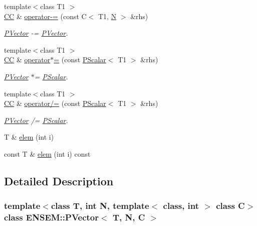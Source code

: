 \begin{DoxyCompactItemize}
{\footnotesize template$<$class T1 $>$ }\\\mbox{\hyperlink{classENSEM_1_1PVector_a92dc0a0a301a3dc96f7be5d337019bc7}{CC}} \& \mbox{\hyperlink{classENSEM_1_1PVector_afe4c144dcca484fed4ee1924d1e387be}{operator-\/=}} (const C$<$ T1, \mbox{\hyperlink{operator__name__util_8cc_a7722c8ecbb62d99aee7ce68b1752f337}{N}} $>$ \&rhs)
\begin{DoxyCompactList}\small\item\em \mbox{\hyperlink{classENSEM_1_1PVector}{P\+Vector}} -\/= \mbox{\hyperlink{classENSEM_1_1PVector}{P\+Vector}}. \end{DoxyCompactList}\item 
{\footnotesize template$<$class T1 $>$ }\\\mbox{\hyperlink{classENSEM_1_1PVector_a92dc0a0a301a3dc96f7be5d337019bc7}{CC}} \& \mbox{\hyperlink{classENSEM_1_1PVector_af17add91449d0507d1a0361ba1a3cc64}{operator$\ast$=}} (const \mbox{\hyperlink{classENSEM_1_1PScalar}{P\+Scalar}}$<$ T1 $>$ \&rhs)
\begin{DoxyCompactList}\small\item\em \mbox{\hyperlink{classENSEM_1_1PVector}{P\+Vector}} $\ast$= \mbox{\hyperlink{classENSEM_1_1PScalar}{P\+Scalar}}. \end{DoxyCompactList}\item 
{\footnotesize template$<$class T1 $>$ }\\\mbox{\hyperlink{classENSEM_1_1PVector_a92dc0a0a301a3dc96f7be5d337019bc7}{CC}} \& \mbox{\hyperlink{classENSEM_1_1PVector_a0da5cf65327a7044128b9a36a49b94e6}{operator/=}} (const \mbox{\hyperlink{classENSEM_1_1PScalar}{P\+Scalar}}$<$ T1 $>$ \&rhs)
\begin{DoxyCompactList}\small\item\em \mbox{\hyperlink{classENSEM_1_1PVector}{P\+Vector}} /= \mbox{\hyperlink{classENSEM_1_1PScalar}{P\+Scalar}}. \end{DoxyCompactList}\item 
T \& \mbox{\hyperlink{classENSEM_1_1PVector_a9cd0edde5b031651ca54dcbd424cc7d8}{elem}} (int i)
\item 
const T \& \mbox{\hyperlink{classENSEM_1_1PVector_a7c7ccc3b772ecddfeb58bb552ffcdbb9}{elem}} (int i) const
\end{DoxyCompactItemize}


\subsection{Detailed Description}
\subsubsection*{template$<$class T, int N, template$<$ class, int $>$ class C$>$\newline
class E\+N\+S\+E\+M\+::\+P\+Vector$<$ T, N, C $>$}

